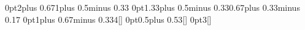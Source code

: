 \titlespacing*{\section}%
	{0pt}{2\baselineskip plus 0.67\baselineskip}{1\baselineskip plus 0.5\baselineskip minus 0.33\baselineskip}
\titlespacing*{\subsection}%
	{0pt}{1.33\baselineskip plus 0.5\baselineskip minus 0.33\baselineskip}{0.67\baselineskip plus 0.33\baselineskip minus 0.17\baselineskip}
\titlespacing{\subsubsection}%
	{0pt}{1\baselineskip plus 0.67\baselineskip minus 0.33\baselineskip}{4\wordsep}[]
\titlespacing{\paragraph}
	{0pt}{0.5\baselineskip plus 0.5\baselineskip}{3\wordsep}[]
\titlespacing{\subparagraph}
	{\parindent}{0pt}{3\wordsep}[]

\setlength{\marginparwidth}{3.6cm}
\setlength{\marginparsep}{0.4cm}
\setlength{\marginparpush}{0.4cm}